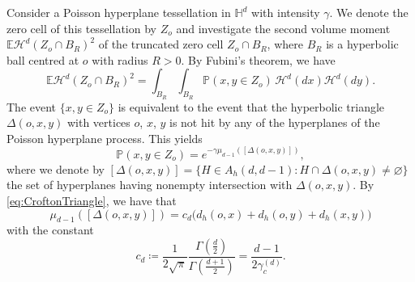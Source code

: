 \documentclass[11pt,a4paper]{article}
\theoremstyle{plain}
\theoremstyle{definition}
\theoremstyle{remark}
\def\EE{\mathbb{E}}
\def\HH{\mathbb{H}}
\def\PP{\mathbb{P}}
\def\cH{\mathcal{H}}
\begin{document}
Consider a Poisson hyperplane tessellation in $\HH^d$ with intensity $\gamma$. We denote the zero cell of this tessellation by $Z_o$ and investigate the second volume moment $\EE\cH^d(Z_o\cap B_R)^2$ of the truncated zero cell $Z_o \cap B_R$, where $B_R$ is a hyperbolic ball centred at $o$ with radius $R > 0$.
By Fubini's theorem, we have
\[
\EE\cH^d(Z_o\cap B_R)^2 = \int_{B_R}\int_{B_R}\PP(x,y\in Z_o)\,\cH^d(dx)\cH^d(dy).
\]
The event $\{x,y\in Z_o\}$ is equivalent to the event that the hyperbolic triangle $\Delta(o,x,y)$ with vertices $o$, $x$, $y$ is not hit by any of the hyperplanes of the Poisson hyperplane process.
This yields
\[ \PP(x,y\in Z_o) = e^{-\gamma\mu_{d-1}([\Delta(o,x,y)])}, \]
where we denote by $[\Delta(o,x,y)]=\{H\in A_h(d,d-1):H\cap \Delta(o,x,y)\neq\varnothing\}$ the set of hyperplanes having nonempty intersection with $\Delta(o,x,y)$.
By \eqref{eq:CroftonTriangle}, we have that
\[ \mu_{d-1}([\Delta(o,x,y)]) 
= c_d \big(d_h(o,x)+d_h(o,y)+d_h(x,y)\big) \]
with the constant
\begin{equation}\label{eq:def_cd}
c_d 
\coloneqq \frac{1}{2\sqrt{\pi}}  \frac{\Gamma(\frac{d}{2})}{\Gamma(\frac{d+1}{2})} 
= \frac{d-1}{2\gamma_c^{(d)}}.     
\end{equation}
\end{document}
